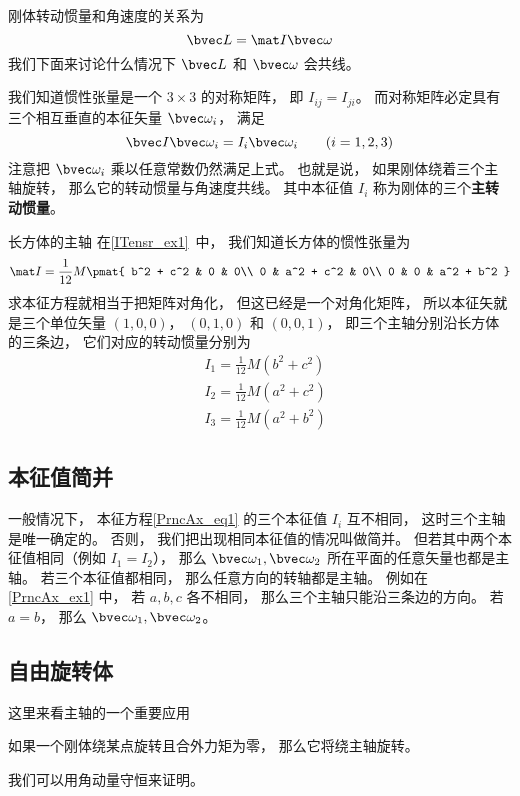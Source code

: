 
\begin{issues}
\issueDraft
\end{issues}


刚体转动惯量和角速度的关系为
\begin{equation}
\bvec L = \mat I \bvec \omega
\end{equation}
我们下面来讨论什么情况下 $\bvec L$ 和 $\bvec \omega$ 会共线。

我们知道惯性张量是一个 $3\times 3$ 的对称矩阵， 即 $I_{ij} = I_{ji}$。 而对称矩阵必定具有三个相互垂直的本征矢量 $\bvec \omega_i$， 满足
\begin{equation}\label{PrncAx_eq1}
\bvec I \bvec \omega_i = I_i \bvec \omega_i \qquad (i = 1,2,3)
\end{equation}
注意把 $\bvec \omega_i$ 乘以任意常数仍然满足上式。 也就是说， 如果刚体绕着三个主轴旋转， 那么它的转动惯量与角速度共线。 其中本征值 $I_i$ 称为刚体的三个\textbf{主转动惯量}。

\begin{example}{长方体的主轴}\label{PrncAx_ex1}
在\autoref{ITensr_ex1}~中， 我们知道长方体的惯性张量为
\begin{equation}
\mat I = \frac{1}{12} M
\pmat{
   b^2 + c^2 & 0 & 0\\
   0 & a^2 + c^2 & 0\\
   0 & 0 & a^2 + b^2
}
\end{equation}
求本征方程就相当于把矩阵对角化， 但这已经是一个对角化矩阵， 所以本征矢就是三个单位矢量 $(1,0,0)$， $(0,1,0)$ 和 $(0,0,1)$， 即三个主轴分别沿长方体的三条边， 它们对应的转动惯量分别为
\begin{equation}
\begin{aligned}
&I_1 = \frac{1}{12}M(b^2+c^2)\\
&I_2 = \frac{1}{12}M(a^2+c^2)\\
&I_3 = \frac{1}{12}M(a^2+b^2)
\end{aligned}
\end{equation}
\end{example}

\subsection{本征值简并}
一般情况下， 本征方程\autoref{PrncAx_eq1} 的三个本征值 $I_i$ 互不相同， 这时三个主轴是唯一确定的。 否则， 我们把出现相同本征值的情况叫做简并。 但若其中两个本征值相同（例如 $I_1 = I_2$）， 那么 $\bvec \omega_1, \bvec \omega_2$ 所在平面的任意矢量也都是主轴。 若三个本征值都相同， 那么任意方向的转轴都是主轴。 例如在\autoref{PrncAx_ex1} 中， 若 $a,b,c$ 各不相同， 那么三个主轴只能沿三条边的方向。 若 $a = b$， 那么 $\bvec \omega_1, \bvec \omega_2$。

\subsection{自由旋转体}
这里来看主轴的一个重要应用
\begin{theorem}{}
如果一个刚体绕某点旋转且合外力矩为零， 那么它将绕主轴旋转。
\end{theorem}
我们可以用角动量守恒来证明。
